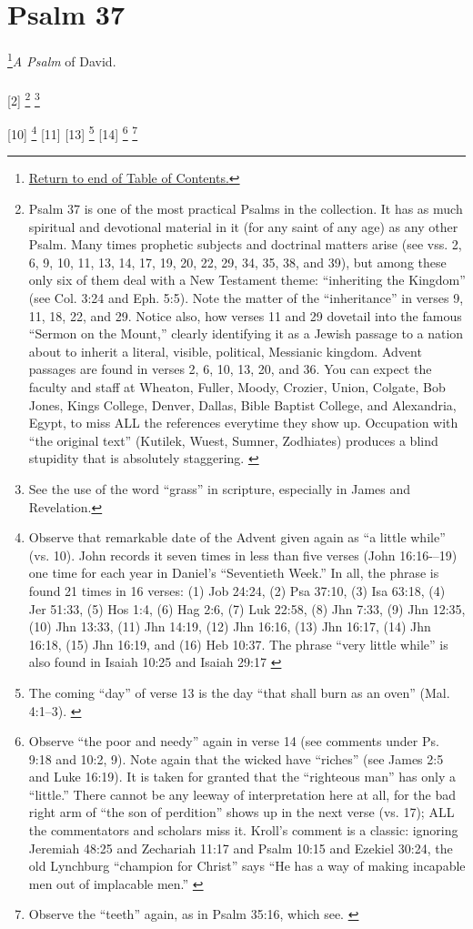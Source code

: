 \chapter{Psalm 37}
\footnote{\textcolor[rgb]{0.00,0.25,0.00}{\hyperlink{TOC}{Return to end of Table of Contents.}}}\textcolor[rgb]{0.00,0.00,1.00}{\emph{A Psalm} of David.}\\
\\


[2] \footnote{Psalm 37 is one of the most practical Psalms in the collection. It has as much spiritual and devotional material in it (for any saint of any age) as any other Psalm. Many times prophetic subjects and doctrinal matters arise (see vss. 2, 6, 9, 10, 11, 13, 14, 17, 19, 20, 22, 29, 34, 35, 38, and 39), but among these only six of them deal with a New Testament theme: “inheriting the Kingdom” (see Col. 3:24 and Eph. 5:5). Note the matter of the “inheritance” in verses 9, 11, 18, 22, and 29. Notice also, how verses 11 and 29 dovetail into the famous “Sermon on the Mount,” clearly identifying it as a Jewish passage to a nation about to inherit a literal, visible, political, Messianic kingdom. Advent passages are found in verses 2, 6, 10, 13, 20, and 36. You can expect the faculty and staff at Wheaton, Fuller, Moody, Crozier, Union, Colgate, Bob Jones, Kings College, Denver, Dallas, Bible Baptist College, and Alexandria, Egypt, to miss ALL the references everytime they show up. Occupation with “the original text” (Kutilek, Wuest, Sumner, Zodhiates) produces a blind stupidity that is absolutely staggering. \cite{Ruckman1992Psalms}} \footnote{See the use of the word ``grass'' in scripture, especially in James and Revelation.}

[10] \footnote{Observe that remarkable date of the Advent given again as “a little while” (vs. 10). John records it seven times in less than five verses (John 16:16-–19) one time for each year in Daniel’s “Seventieth Week.” In all, the phrase is found 21 times in 16 verses: (1) Job 24:24, (2) Psa 37:10, (3) Isa 63:18, (4) Jer 51:33, (5) Hos 1:4, (6) Hag 2:6, (7) Luk 22:58, (8) Jhn 7:33, (9) Jhn 12:35, (10)  Jhn 13:33, (11) Jhn 14:19, (12) Jhn 16:16, (13) Jhn 16:17, (14) Jhn 16:18, (15) Jhn 16:19, and (16) Heb 10:37.  The phrase ``very little while'' is also found in Isaiah 10:25 and Isaiah 29:17 \cite{Ruckman1992Psalms}}
[11] 
[13] \footnote{The coming “day” of verse 13 is the day “that shall burn as an oven” (Mal. 4:1–3). \cite{Ruckman1992Psalms}}
[14] \footnote{Observe “the poor and needy” again in verse 14 (see comments under Ps. 9:18 and 10:2, 9). Note again that the wicked have “riches” (see James 2:5 and Luke 16:19). It is taken for granted that the “righteous man” has only a “little.” There cannot be any leeway of interpretation here at all, for the bad right arm of “the son of perdition” shows up in the next verse (vs. 17); ALL the commentators and scholars miss it. Kroll’s comment is a classic: ignoring Jeremiah 48:25 and Zechariah 11:17 and Psalm 10:15 and Ezekiel 30:24, the old Lynchburg “champion for Christ” says ``He has a way of making incapable men out of implacable men.'' \cite{Ruckman1992Psalms}} \footnote{Observe the “teeth” again, as in Psalm 35:16, which see. \cite{Ruckman1992Psalms}}


